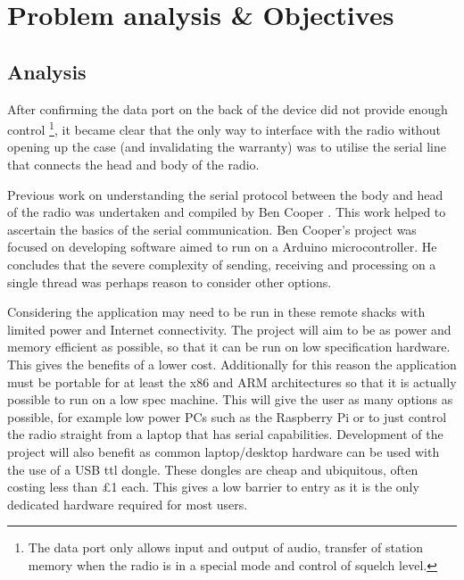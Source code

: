 \chapter{Problem analysis \& Objectives}
\section{Analysis}
After confirming the data port on the back of the device did not provide enough control \footnote{The data port only allows input and output of audio, transfer of station memory when the radio is in a special mode and control of squelch level.}, it became clear that the only way to interface with the radio without opening up the case (and invalidating the warranty) was to utilise the serial line that connects the head and body of the radio.

Previous work on understanding the serial protocol between the body and head of the radio was undertaken and compiled by Ben Cooper \cite{ben_report}\cite{8800r_reverse}. This work helped to ascertain the basics of the serial communication. Ben Cooper's project was focused on developing software aimed to run on a Arduino microcontroller. He concludes that the severe complexity of sending, receiving and processing on a single thread was perhaps reason to consider other options.

Considering the application may need to be run in these remote shacks with limited power and Internet connectivity. The project will aim to be as power and memory efficient as possible, so that it can be run on low specification hardware. This gives the benefits of a lower cost. Additionally for this reason the application must be portable for at least the x86 and ARM architectures so that it is actually possible to run on a low spec machine. This will give the user as many options as possible, for example low power PCs such as the Raspberry Pi or to just control the radio straight from a laptop that has serial capabilities. Development of the project will also benefit as common laptop/desktop hardware can be used with the use of a USB \gls{ttl} dongle. These dongles are cheap and ubiquitous, often costing less than \pounds1 each. This gives a low barrier to entry as it is the only dedicated hardware required for most users.

